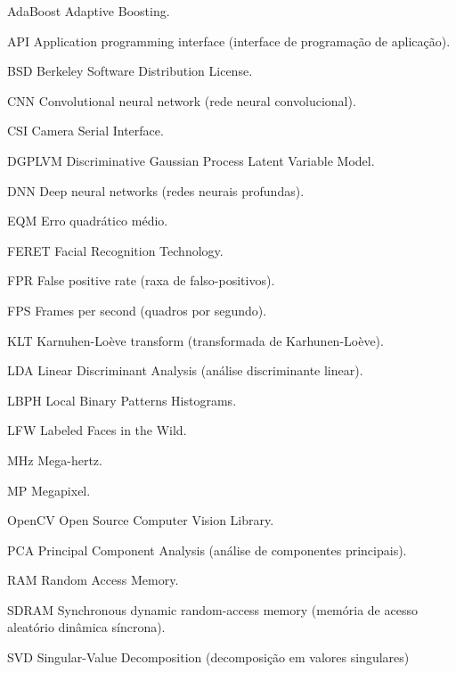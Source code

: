 \begin{siglas}
  \item[AdaBoost] Adaptive Boosting.%
  \item[API] Application programming interface (interface de programação de aplicação).
  \item[BSD] Berkeley Software Distribution License.%
  \item[CNN] Convolutional neural network (rede neural convolucional).
  \item[CSI] Camera Serial Interface.
  \item[DGPLVM] Discriminative Gaussian Process Latent Variable Model.
  \item[DNN] Deep neural networks (redes neurais profundas).
  \item[EQM] Erro quadrático médio.
  \item[FERET] Facial Recognition Technology.
  \item[FPR] False positive rate (raxa de falso-positivos).
  \item[FPS] Frames per second (quadros por segundo).
  \item[KLT] Karnuhen-Loève transform (transformada de Karhunen-Loève).
  \item[LDA] Linear Discriminant Analysis (análise discriminante linear).
  \item[LBPH] Local Binary Patterns Histograms.
  \item[LFW] Labeled Faces in the Wild.
  \item[MHz] Mega-hertz.
  \item[MP] Megapixel.
  \item[OpenCV] Open Source Computer Vision Library.
  \item[PCA] Principal Component Analysis (análise de componentes principais).
  \item[RAM] Random Access Memory.
  \item[SDRAM] Synchronous dynamic random-access memory (memória de acesso aleatório dinâmica síncrona).
  \item[SVD] Singular-Value Decomposition (decomposição em valores singulares)
\end{siglas}
